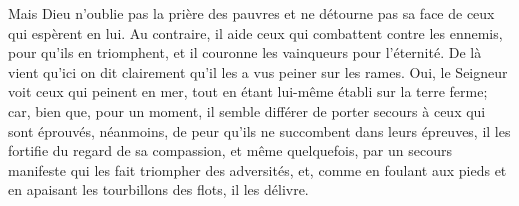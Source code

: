 Mais Dieu n’oublie pas la prière des pauvres
	et ne détourne pas sa face de ceux qui espèrent en lui.
Au contraire, il aide ceux qui combattent contre les ennemis,
	pour qu’ils en triomphent, et il couronne les vainqueurs pour l’éternité.
De là vient qu’ici on dit clairement
	qu’il les a vus peiner sur les rames.
Oui, le Seigneur voit ceux qui peinent en mer,
	tout en étant lui-même établi sur la terre ferme;
	car, bien que, pour un moment,
		il semble différer de porter secours à ceux qui sont éprouvés,
	néanmoins, de peur qu’ils ne succombent dans leurs épreuves,
	il les fortifie du regard de sa compassion,
	et même quelquefois, par un secours manifeste
		qui les fait triompher des adversités,
	et, comme en foulant aux pieds et en apaisant les tourbillons des flots,
	il les délivre.
